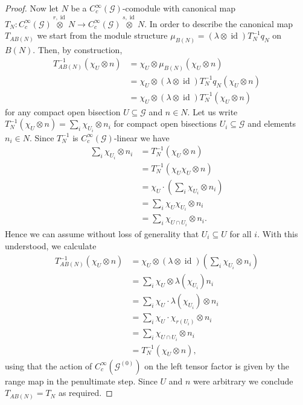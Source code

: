 \documentclass{amsart}
\newcommand{\G}{\mathcal{G}}
\newcommand{\ccinfty}{C_c^\infty}
\DeclareMathOperator{\id}{id}
\begin{document}
\begin{proof}
Now let $ N $ be a $ \ccinfty(\G) $-comodule with canonical map $ T_N:\ccinfty(\G)\stackrel{r,\id}{\otimes} N \rightarrow \ccinfty(\G)\stackrel{s,\id}{\otimes} N $. In order to describe the canonical map $ T_{AB(N)} $ we start from the module structure $ \mu_{B(N)} = (\lambda \otimes \id) T^{-1}_N q_N $ on $ B(N) $. Then, by construction, 
\begin{align*}
T^{-1}_{AB(N)}(\chi_U\otimes n) &= \chi_U \otimes \mu_{B(N)}(\chi_{U} \otimes n) \\ 
&=\chi_U\otimes (\lambda \otimes \id) T^{-1}_N q_N(\chi_U \otimes n) \\ 
&=\chi_U\otimes (\lambda \otimes \id) T^{-1}_N(\chi_U \otimes n)
\end{align*} 
for any compact open bisection $ U \subseteq \G $ and $ n \in N $. 
Let us write $ T^{-1}_N(\chi_U \otimes n) = \sum_i \chi_{U_i} \otimes n_i $ for compact open bisections $ U_i \subseteq \G $ and elements $ n_i \in N $. Since $ T^{-1}_N $ is $ \ccinfty(\G) $-linear we have
\begin{align*}
\sum_i\chi_{U_i}\otimes n_i &= T^{-1}_N(\chi_U\otimes n) \\
&= T^{-1}_N(\chi_U \chi_U \otimes n) \\
&= \chi_U \cdot (\sum_i\chi_{U_i}\otimes n_i) \\
&= \sum_i \chi_U \chi_{U_i} \otimes n_i \\
&= \sum_i \chi_{U \cap U_i} \otimes n_i.
\end{align*}
Hence we can assume without loss of generality that $ U_i \subseteq U $ for all $ i $. 
With this understood, we calculate 
\begin{align*} 
T^{-1}_{AB(N)}(\chi_U\otimes n) &=\chi_U\otimes (\lambda \otimes \id)(\sum_i\chi_{U_i}\otimes n_i) \\
&= \sum_i \chi_U\otimes \lambda(\chi_{U_i}) n_i \\
&= \sum_i \chi_U \cdot \lambda(\chi_{U_i}) \otimes n_i \\
&= \sum_i \chi_U\cdot \chi_{r(U_i)} \otimes n_i \\ 
&= \sum_i \chi_{U\cap U_i} \otimes n_i \\
&= T^{-1}_N(\chi_U\otimes n), 
\end{align*}
using that the action of $ \ccinfty(\G^{(0)}) $ on the left tensor factor is given by the range map in the penultimate step. Since $ U $ and $ n $ were arbitrary we conclude $ T_{AB(N)} = T_N $ as required. 
\end{proof}
\end{document}
